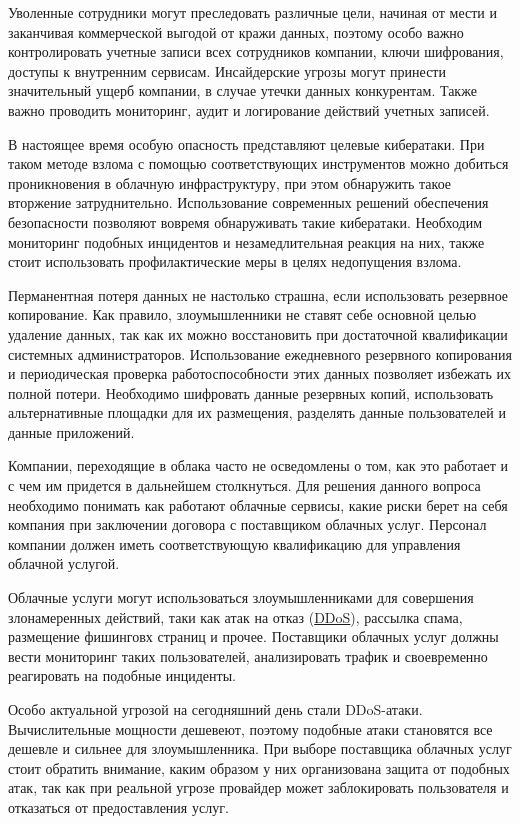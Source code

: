 Уволенные сотрудники могут преследовать различные цели, начиная от мести и заканчивая коммерческой выгодой от кражи данных, поэтому особо важно контролировать учетные записи всех сотрудников компании, ключи шифрования, доступы к внутренним сервисам.
Инсайдерские угрозы могут принести значительный ущерб компании, в случае утечки данных конкурентам.
Также важно проводить мониторинг, аудит и логирование действий учетных записей.

В настоящее время особую опасность представляют целевые кибератаки.
При таком методе взлома с помощью соответствующих инструментов можно добиться проникновения в облачную инфраструктуру, при этом обнаружить такое вторжение затруднительно.
Использование современных решений обеспечения безопасности позволяют вовремя обнаруживать такие кибератаки.
Необходим мониторинг подобных инцидентов и незамедлительная реакция на них, также стоит использовать профилактические меры в целях недопущения взлома.

Перманентная потеря данных не настолько страшна, если использовать резервное копирование.
Как правило, злоумышленники не ставят себе основной целью удаление данных, так как их можно восстановить при достаточной квалификации системных администраторов.
Использование ежедневного резервного копирования и периодическая проверка работоспособности этих данных позволяет избежать их полной потери.
Необходимо шифровать данные резервных копий, использовать альтернативные площадки для их размещения, разделять данные пользователей и данные приложений.

Компании, переходящие в облака часто не осведомлены о том, как это работает и с чем им придется в дальнейшем столкнуться.
Для решения данного вопроса необходимо понимать как работают облачные сервисы, какие риски берет на себя компания при заключении договора с поставщиком облачных услуг.
Персонал компании должен иметь соответствующую квалификацию для управления облачной услугой.

Облачные услуги могут использоваться злоумышленниками для совершения злонамеренных действий, таки как атак на отказ (\hyperlink{ddos}{DDoS}), рассылка спама, размещение фишинговх страниц и прочее.
Поставщики облачных услуг должны вести мониторинг таких пользователей, анализировать трафик и своевременно реагировать на подобные инциденты.

Особо актуальной угрозой на сегодняшний день стали DDoS-атаки.
Вычислительные мощности дешевеют, поэтому подобные атаки становятся все дешевле и сильнее для злоумышленника.
При выборе поставщика облачных услуг стоит обратить внимание, каким образом у них организована защита от подобных атак, так как при реальной угрозе провайдер может заблокировать пользователя и отказаться от предоставления услуг.

